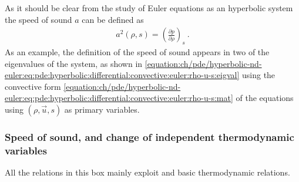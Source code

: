 \documentclass[letterpaper,10pt,english]{jupyterBook}
\begin{document}
\sphinxAtStartPar
As it should be clear from the study of Euler equations as an hyperbolic system  the speed of sound \(a\) can be defined as
\begin{equation}\label{equation:ch/pde/hyperbolic-nd-euler:eq:pde:hyperbolic:euler:speed-of-sound:rho-s}
\begin{split}
  a^2(\rho, s) = \left( \frac{\partial p}{\partial \rho} \right)_s \ .
\end{split}
\end{equation}
\sphinxAtStartPar
As an example, the definition of the speed of sound appears in two of the eigenvalues of the system, as shown in \eqref{equation:ch/pde/hyperbolic-nd-euler:eq:pde:hyperbolic:differential:convective:euler:rho-u-s:eigval} using the convective form \eqref{equation:ch/pde/hyperbolic-nd-euler:eq:pde:hyperbolic:differential:convective:euler:rho-u-s:mat} of the equations using \((\rho, \vec{u}, s)\) as primary variables.
\subsubsection*{Speed of sound, and change of independent thermodynamic variables}

\sphinxAtStartPar
All the relations in this box mainly exploit  and basic thermodynamic relations.
\end{document}
